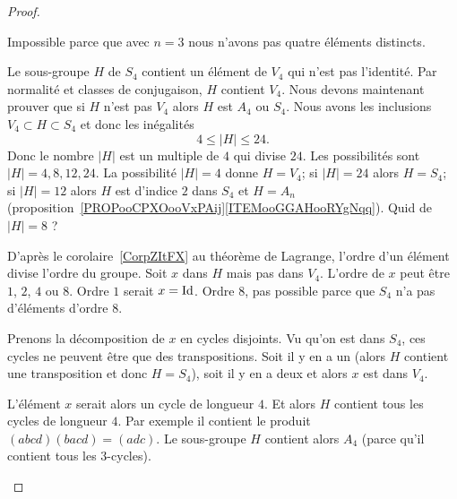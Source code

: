 \begin{proof}
\begin{subproof}
\begin{subproof}
                    Impossible parce que avec \( n=3\) nous n'avons pas quatre éléments distincts.

                \item[Si \( n=4\)]

                    Le sous-groupe \( H\) de \( S_4\) contient un élément de \( V_4\) qui n'est pas l'identité. Par normalité et classes de conjugaison, \( H\) contient \( V_4\). Nous devons maintenant prouver que si \( H\) n'est pas \( V_4\) alors \( H\) est \( A_4\) ou \( S_4\). Nous avons les inclusions \( V_4\subset H\subset S_4\) et donc les inégalités
                    \begin{equation}
                        4\leq | H |\leq 24.
                    \end{equation}
                    Donc le nombre \( | H |\) est un multiple de \( 4\) qui divise \( 24\). Les possibilités sont \( | H |=4,8,12,24\). La possibilité \( | H |=4\) donne \( H=V_4\); si \( |H |=24\) alors \( H=S_4\); si \( | H |=12\) alors \( H\) est d'indice \( 2\) dans \( S_4\) et \( H=A_n\) (proposition~\ref{PROPooCPXOooVxPAij}\ref{ITEMooGGAHooRYgNqq}). Quid de \( | H |=8\) ?

                    D'après le corolaire~\ref{CorpZItFX} au théorème de Lagrange, l'ordre d'un élément divise l'ordre du groupe. Soit \( x\) dans \( H\) mais pas dans \( V_4\). L'ordre de \( x\) peut être \( 1\), \( 2\), \( 4\) ou \( 8\). Ordre \( 1\) serait \( x=\operatorname{Id}\). Ordre \( 8\), pas possible parce que \( S_4\) n'a pas d'éléments d'ordre \( 8\).
                    \begin{subproof}
                        \item[\( x\) d'ordre \( 2\)]

                            Prenons la décomposition de \( x\) en cycles disjoints. Vu qu'on est dans \( S_4\), ces cycles ne peuvent être que des transpositions. Soit il y en a un (alors \( H\) contient une transposition et donc \( H=S_4\)), soit il y en a deux et alors \( x\) est dans \( V_4\).

                        \item[\( x\) d'ordre \( 4\)]

                            L'élément \( x\) serait alors un cycle de longueur \( 4\). Et alors \( H\) contient tous les cycles de longueur \( 4\). Par exemple il contient le produit \( (abcd)(bacd)=(adc)\). Le sous-groupe \( H\) contient alors \( A_4\) (parce qu'il contient tous les \( 3\)-cycles).
                    \end{subproof}


\end{subproof}
\end{subproof}
\end{proof}
